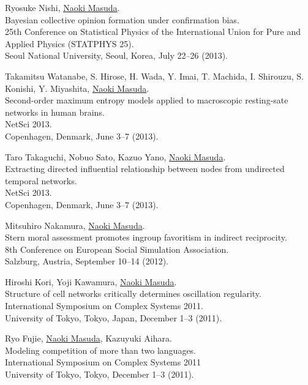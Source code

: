\documentclass[11pt,letter]{article}
\begin{document}
\begin{etaremune}
\item Ryosuke Nishi, \underline{Naoki Masuda}.\\
Bayesian collective opinion formation under confirmation bias.\\
25th Conference on Statistical Physics of the International Union for Pure and Applied Physics (STATPHYS 25).\\
Seoul National University, Seoul, Korea, July 22--26 (2013).

\item Takamitsu Watanabe, S. Hirose, H. Wada, Y. Imai, T. Machida, I. Shirouzu, S. Konishi, Y. Miyashita, \underline{Naoki Masuda}.\\
Second-order maximum entropy models applied to macroscopic resting-sate networks in human brains.\\
NetSci 2013.\\
Copenhagen, Denmark, June 3--7 (2013).

\item Taro Takaguchi, Nobuo Sato, Kazuo Yano, \underline{Naoki Masuda}.\\
Extracting directed influential relationship between nodes from undirected temporal networks.\\
NetSci 2013.\\
Copenhagen, Denmark, June 3--7 (2013).

\item Mitsuhiro Nakamura, \underline{Naoki Masuda}.\\
Stern moral assessment promotes ingroup favoritism in indirect reciprocity.\\
8th Conference on European Social Simulation Association.\\
Salzburg, Austria, September 10--14 (2012).

\item Hiroshi Kori, Yoji Kawamura, \underline{Naoki Masuda}.\\
Structure of cell networks critically determines oscillation regularity.\\
International Symposium on Complex Systems 2011.\\
University of Tokyo, Tokyo, Japan, December 1--3 (2011).

\item Ryo Fujie, \underline{Naoki Masuda}, Kazuyuki Aihara.\\
Modeling competition of more than two languages.\\
International Symposium on Complex Systems 2011\\
University of Tokyo, Tokyo, December 1--3 (2011).


\end{etaremune}
\end{document}

